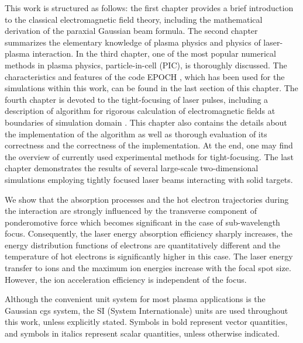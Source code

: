 This work is structured as follows: the first chapter provides a brief introduction to the classical electromagnetic field theory, including the mathematical derivation of the paraxial Gaussian beam formula. The second chapter summarizes the elementary knowledge of plasma physics and physics of laser-plasma interaction. In the third chapter, one of the most popular numerical methods in plasma physics, particle-in-cell (PIC), is thoroughly discussed. The characteristics and features of the code EPOCH \cite{bennett}, which has been used for the simulations within this work, can be found in the last section of this chapter. The fourth chapter is devoted to the tight-focusing of laser pulses, including a description of algorithm for rigorous calculation of electromagnetic fields at boundaries of simulation domain \cite{Thiele2016}. This chapter also contains the details about the implementation of the algorithm as well as thorough evaluation of its correctness and the correctness of the implementation. At the end, one may find the overview of currently used experimental methods for tight-focusing. The last chapter demonstrates the results of several large-scale two-dimensional simulations employing tightly focused laser beams interacting with solid targets.

We show that the absorption processes and the hot electron trajectories during the interaction are strongly influenced by the transverse component of ponderomotive force which becomes significant in the case of sub-wavelength focus. Consequently, the laser energy absorption efficiency sharply increases, the energy distribution functions of electrons are quantitatively different and the temperature of hot electrons is significantly higher in this case. The laser energy transfer to ions and the maximum ion energies increase with the focal spot size. However, the ion acceleration efficiency is independent of the focus.

Although the convenient unit system for most plasma applications is the Gaussian cgs system, the SI (System Internationale) units are used throughout this work, unless explicitly stated. Symbols in bold represent vector quantities, and symbols in italics represent scalar quantities, unless otherwise indicated.
